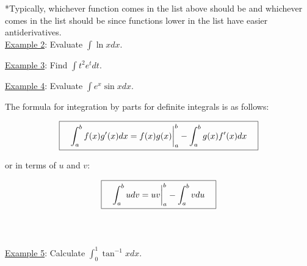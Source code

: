 \documentclass[paper=a4, fontsize=11pt]{scrartcl} %
\numberwithin{equation}{section} %
\numberwithin{figure}{section} %
\numberwithin{table}{section} %
\newcommand{\ds}{\displaystyle}
\begin{document}
*Typically, whichever function comes \underline{\hspace{1in}} in the list above should be \underline{\hspace{0.4in}} and whichever comes \underline{\hspace{1in}} in the list should be \underline{\hspace{0.5in}} since functions lower in the list have easier antiderivatives.\\
\indent
\newpage
\underline{Example 2}: Evaluate $\ds\int \ln x dx$.\\
\indent

\vspace{3in}


\underline{Example 3}: Find $\ds\int t^2 e^t dt$.\\
\indent

\vspace{3in}

\underline{Example 4}: Evaluate $\ds\int e^x\sin x dx$.\\
\indent

\vspace{4in}

\newpage

The formula for integration by parts for definite integrals is as follows:

\[\boxed{\quad \ds\int_a^b f(x) g'(x)dx = f(x) g(x)\bigg{|}_a^b - \ds\int_a^b g(x) f'(x)dx \quad }\]

or in terms of $u$ and $v$:

\[ \boxed{\quad \ds\int_a^b u dv = uv\bigg{|}_a^b - \ds\int_a^b v du \quad }\]
\indent\\
\indent\\
\indent

\underline{Example 5}: Calculate $\ds\int_0^1 \tan^{-1}x dx$.\\
\indent

\vspace{4in}


\end{document}
